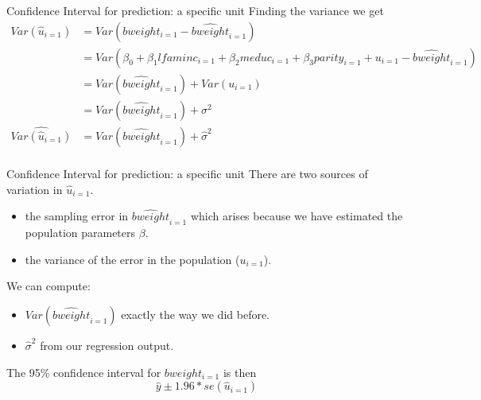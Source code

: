 \documentclass[
  ignorenonframetext,
]{beamer}
\begin{document}
\begin{frame}{Confidence Interval for prediction: a specific unit}
\protect\hypertarget{confidence-interval-for-prediction-a-specific-unit-3}{}
Finding the variance we get \footnotesize \[
\begin{aligned}
Var(\hat{u}_{i=1})&=Var(bweight_{i=1}-\widehat{bweight}_{i=1})\\
&=Var(\beta_0+\beta_1lfaminc_{i=1}+\beta_2meduc_{i=1}+\beta_3parity_{i=1}+u_{i=1}-\widehat{bweight}_{i=1})\\
&=Var(\widehat{bweight}_{i=1})+Var(u_{i=1})\\
&=Var(\widehat{bweight}_{i=1})+\sigma^2\\
\widehat{Var(\hat{u}_{i=1})}&=Var(\widehat{bweight}_{i=1})+\hat{\sigma}^2\\
\end{aligned}
\]
\end{frame}

\begin{frame}{Confidence Interval for prediction: a specific unit}
\protect\hypertarget{confidence-interval-for-prediction-a-specific-unit-4}{}
There are two sources of variation in \(\hat{u}_{i=1}\).

\begin{itemize}
\item
  the sampling error in \(\widehat{bweight}_{i=1}\) which arises because
  we have estimated the population parameters \(\beta\).
\item
  the variance of the error in the population (\(u_{i=1}\)).
\end{itemize}

We can compute:

\begin{itemize}
\item
  \(Var(\widehat{bweight}_{i=1})\) exactly the way we did before.
\item
  \(\hat{\sigma}^2\) from our regression output.
\end{itemize}

The 95\% confidence interval for \(bweight_{i=1}\) is then \[
\hat{y}\pm1.96*se(\hat{u}_{i=1})
\]
\end{frame}
\end{document}
